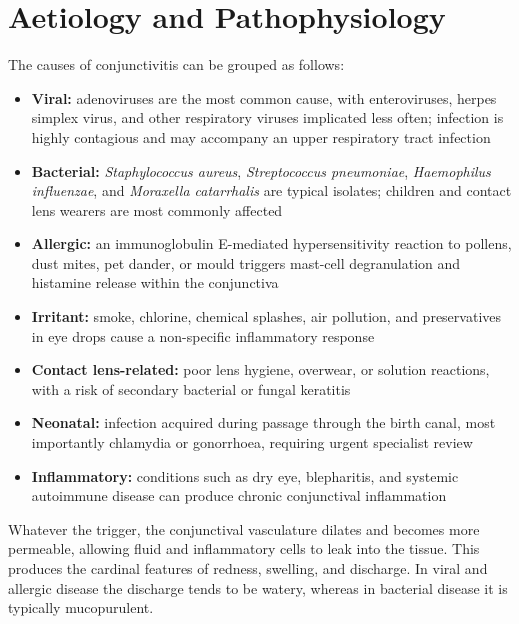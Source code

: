 \section*{Aetiology and Pathophysiology}
\medskip
\noindent The causes of conjunctivitis can be grouped as follows:
\begin{itemize}
    \item \textbf{Viral:} adenoviruses are the most common cause, with enteroviruses, herpes simplex virus, and other respiratory viruses implicated less often; infection is highly contagious and may accompany an upper respiratory tract infection
    \item \textbf{Bacterial:} \textit{Staphylococcus aureus}, \textit{Streptococcus pneumoniae}, \textit{Haemophilus influenzae}, and \textit{Moraxella catarrhalis} are typical isolates; children and contact lens wearers are most commonly affected
    \item \textbf{Allergic:} an immunoglobulin E-mediated hypersensitivity reaction to pollens, dust mites, pet dander, or mould triggers mast-cell degranulation and histamine release within the conjunctiva
    \item \textbf{Irritant:} smoke, chlorine, chemical splashes, air pollution, and preservatives in eye drops cause a non-specific inflammatory response
    \item \textbf{Contact lens-related:} poor lens hygiene, overwear, or solution reactions, with a risk of secondary bacterial or fungal keratitis
    \item \textbf{Neonatal:} infection acquired during passage through the birth canal, most importantly chlamydia or gonorrhoea, requiring urgent specialist review
    \item \textbf{Inflammatory:} conditions such as dry eye, blepharitis, and systemic autoimmune disease can produce chronic conjunctival inflammation
\end{itemize}

Whatever the trigger, the conjunctival vasculature dilates and becomes more permeable, allowing fluid and inflammatory cells to leak into the tissue. This produces the cardinal features of redness, swelling, and discharge. In viral and allergic disease the discharge tends to be watery, whereas in bacterial disease it is typically mucopurulent.

